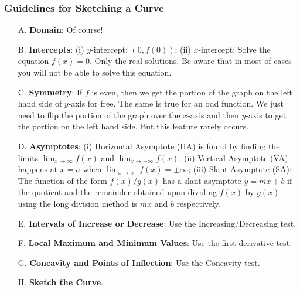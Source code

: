 \documentclass[12pt]{article}
\begin{document}
\subsubsection*{Guidelines for Sketching a Curve}

\begin{itemize}
\item [A.] \textbf{Domain}: Of course!
\item [B.] \textbf{Intercepts}: (i) $y$-intercept: $(0,f(0))$; (ii) $x$-intercept: Solve the equation $f(x) = 0$. Only the real solutions. Be aware that in most of cases you will not be able to solve this equation.
\item [C.] \textbf{Symmetry}: If $f$ is even, then we get the portion of the graph on the left hand side of $y$-axis
for free. The same is true for an odd function. We just need to flip the portion of the graph over the $x$-axis 
and then $y$-axis to get the portion on the left hand side. But this feature rarely occurs.
\item [D.] \textbf{Asymptotes}: (i) Horizontal Asymptote (HA) is found by finding the limits $\lim_{x \to \infty} f(x)$ and $\lim_{x \to -\infty} f(x)$; (ii) Vertical Asymptote (VA) happens at $x = a$ when $\lim_{x \to a^{\pm}} f(x) = \pm \infty$; (iii) Slant Asymptote (SA): The function of the form $f(x)/g(x)$ has a slant asymptote $y = mx + b$ if the quotient and the remainder obtained upon dividing $f(x)$ by $g(x)$ using the long division method is $mx$ and $b$ respectively.
\item [E.] \textbf{Intervals of Increase or Decrease}: Use the Increasing/Decreasing test.
\item [F.] \textbf{Local Maximum and Minimum Values}: Use the first derivative test.
\item [G.] \textbf{Concavity and Points of Inflection}: Use the Concavity test.
\item [H.] \textbf{Sketch the Curve}.
\end{itemize}
\end{document}
